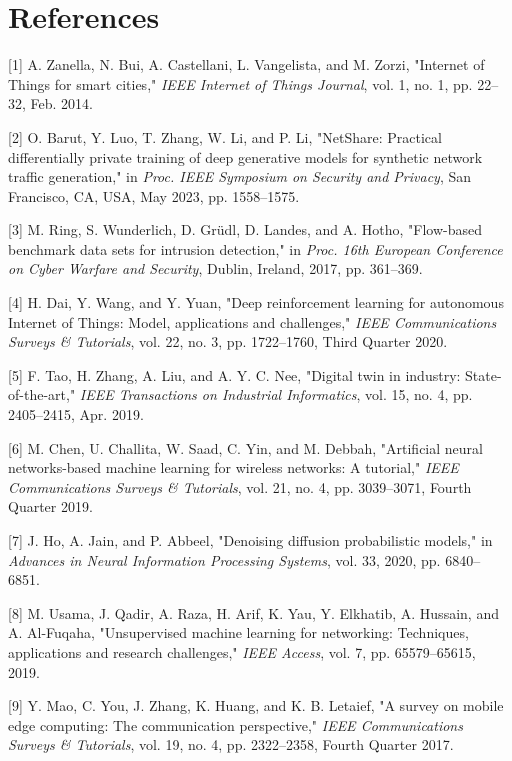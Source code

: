 \documentclass[conference]{IEEEtran}
\begin{document}
\section*{References}

\small

[1] A. Zanella, N. Bui, A. Castellani, L. Vangelista, and M. Zorzi, "Internet of Things for smart cities," \textit{IEEE Internet of Things Journal}, vol. 1, no. 1, pp. 22--32, Feb. 2014.

[2] O. Barut, Y. Luo, T. Zhang, W. Li, and P. Li, "NetShare: Practical differentially private training of deep generative models for synthetic network traffic generation," in \textit{Proc. IEEE Symposium on Security and Privacy}, San Francisco, CA, USA, May 2023, pp. 1558--1575.

[3] M. Ring, S. Wunderlich, D. Grüdl, D. Landes, and A. Hotho, "Flow-based benchmark data sets for intrusion detection," in \textit{Proc. 16th European Conference on Cyber Warfare and Security}, Dublin, Ireland, 2017, pp. 361--369.

[4] H. Dai, Y. Wang, and Y. Yuan, "Deep reinforcement learning for autonomous Internet of Things: Model, applications and challenges," \textit{IEEE Communications Surveys \& Tutorials}, vol. 22, no. 3, pp. 1722--1760, Third Quarter 2020.

[5] F. Tao, H. Zhang, A. Liu, and A. Y. C. Nee, "Digital twin in industry: State-of-the-art," \textit{IEEE Transactions on Industrial Informatics}, vol. 15, no. 4, pp. 2405--2415, Apr. 2019.

[6] M. Chen, U. Challita, W. Saad, C. Yin, and M. Debbah, "Artificial neural networks-based machine learning for wireless networks: A tutorial," \textit{IEEE Communications Surveys \& Tutorials}, vol. 21, no. 4, pp. 3039--3071, Fourth Quarter 2019.

[7] J. Ho, A. Jain, and P. Abbeel, "Denoising diffusion probabilistic models," in \textit{Advances in Neural Information Processing Systems}, vol. 33, 2020, pp. 6840--6851.

[8] M. Usama, J. Qadir, A. Raza, H. Arif, K. Yau, Y. Elkhatib, A. Hussain, and A. Al-Fuqaha, "Unsupervised machine learning for networking: Techniques, applications and research challenges," \textit{IEEE Access}, vol. 7, pp. 65579--65615, 2019.

[9] Y. Mao, C. You, J. Zhang, K. Huang, and K. B. Letaief, "A survey on mobile edge computing: The communication perspective," \textit{IEEE Communications Surveys \& Tutorials}, vol. 19, no. 4, pp. 2322--2358, Fourth Quarter 2017.
\end{document}
